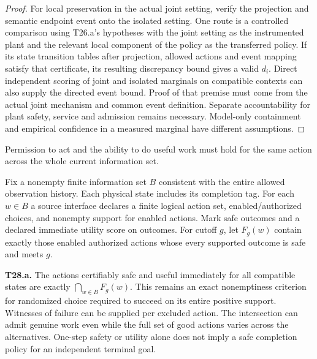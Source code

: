 \begin{proof}
For local preservation in the actual joint setting, verify the projection and semantic endpoint event onto the isolated setting. One route is a controlled comparison using T26.a's hypotheses with the joint setting as the instrumented plant and the relevant local component of the policy as the transferred policy. If its state transition tables after projection, allowed actions and event mapping satisfy that certificate, its resulting discrepancy bound gives a valid \(d_i\). Direct independent scoring of joint and isolated marginals on compatible contexts can also supply the directed event bound. Proof of that premise must come from the actual joint mechanism and common event definition. Separate accountability for plant safety, service and admission remains necessary. Model-only containment and empirical confidence in a measured marginal have different assumptions.

\end{proof}

Permission to act and the ability to do useful work must hold for the same action across the whole current information set.

\begin{theorem}\label{thm:t28}

Fix a nonempty finite information set \(B\) consistent with the entire allowed observation history. Each physical state includes its completion tag. For each \(w\in B\) a source interface declares a finite logical action set, enabled/authorized choices, and nonempty support for enabled actions. Mark safe outcomes and a declared immediate utility score on outcomes. For cutoff \(g\), let \(F_g(w)\) contain exactly those enabled authorized actions whose every supported outcome is safe and meets \(g\).

\label{thm:t28a}

\textbf{T28.a.} The actions certifiably safe and useful immediately for all compatible states are exactly \(\bigcap_{w\in B}F_g(w)\). This remains an exact nonemptiness criterion for randomized choice required to succeed on its entire positive support. Witnesses of failure can be supplied per excluded action. The intersection can admit genuine work even while the full set of good actions varies across the alternatives. One-step safety or utility alone does not imply a safe completion policy for an independent terminal goal.

\end{theorem}

